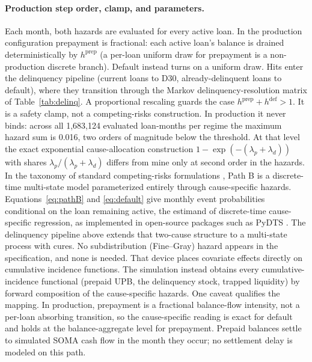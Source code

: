 \documentclass[12pt]{article}
\begin{document}
\paragraph{Production step order, clamp, and parameters.}
Each month, both hazards are evaluated for every active loan. In the production configuration prepayment is fractional: each active loan's balance is drained deterministically by $h^{\mathrm{prep}}$ (a per-loan uniform draw for prepayment is a non-production discrete branch). Default instead turns on a uniform draw. Hits enter the delinquency pipeline (current loans to D30, already-delinquent loans to default), where they transition through the Markov delinquency-resolution matrix of Table~\ref{tab:delinq}. A proportional rescaling guards the case $h^{\mathrm{prep}} + h^{\mathrm{def}} > 1$. It is a safety clamp, not a competing-risks construction. In production it never binds: across all 1,683,124 evaluated loan-months per regime the maximum hazard sum is 0.016, two orders of magnitude below the threshold. At that level the exact exponential cause-allocation construction $1-\exp(-(\lambda_p+\lambda_d))$ with shares $\lambda_p/(\lambda_p+\lambda_d)$ differs from mine only at second order in the hazards. In the taxonomy of standard competing-risks formulations \citep{putter2007}, Path B is a discrete-time multi-state model parameterized entirely through cause-specific hazards. Equations~\eqref{eq:pathB} and \eqref{eq:default} give monthly event probabilities conditional on the loan remaining active, the estimand of discrete-time cause-specific regression, as implemented in open-source packages such as PyDTS \citep{meir2025}. The delinquency pipeline above extends that two-cause structure to a multi-state process with cures. No subdistribution (Fine--Gray) hazard \citep{fine1999} appears in the specification, and none is needed. That device places covariate effects directly on cumulative incidence functions. The simulation instead obtains every cumulative-incidence functional (prepaid UPB, the delinquency stock, trapped liquidity) by forward composition of the cause-specific hazards. One caveat qualifies the mapping. In production, prepayment is a fractional balance-flow intensity, not a per-loan absorbing transition, so the cause-specific reading is exact for default and holds at the balance-aggregate level for prepayment. Prepaid balances settle to simulated SOMA cash flow in the month they occur; no settlement delay is modeled on this path.
\end{document}
